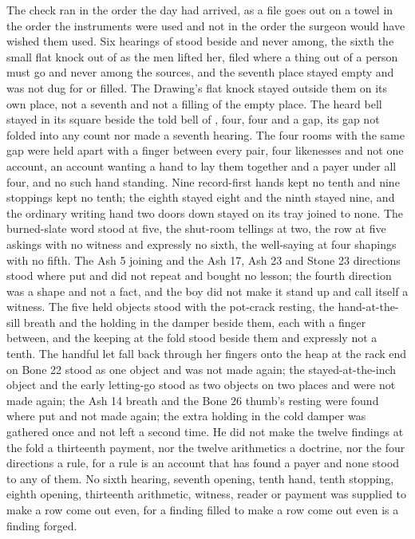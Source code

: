 The check ran in the order the day had arrived, as a file goes out on a towel in the order the instruments were used and not in the order the surgeon would have wished them used. Six hearings of  stood beside and never among, the sixth the small flat knock out of  as the men lifted her, filed where a thing out of a person must go and never among the sources, and the seventh place stayed empty and was not dug for or filled. The Drawing's flat knock stayed outside them on its own place, not a seventh and not a filling of the empty place. The heard bell stayed in its square beside the told bell of , four, four and a gap, its gap not folded into any count nor made a seventh hearing. The four rooms with the same gap were held apart with a finger between every pair, four likenesses and not one account, an account wanting a hand to lay them together and a payer under all four, and no such hand standing. Nine record-first hands kept no tenth and nine stoppings kept no tenth; the eighth stayed eight and the ninth stayed nine, and the ordinary writing hand two doors down stayed on its tray joined to none. The burned-slate word stood at five, the shut-room tellings at two, the row at five askings with no witness and expressly no sixth, the well-saying at four shapings with no fifth. The Ash 5 joining and the Ash 17, Ash 23 and Stone 23 directions stood where put and did not repeat and bought no lesson; the fourth direction was a shape and not a fact, and the boy did not make it stand up and call itself a witness. The five held objects stood with the pot-crack resting, the hand-at-the-sill breath and the holding in the damper beside them, each with a finger between, and the keeping at the fold stood beside them and expressly not a tenth. The handful let fall back through her fingers onto the heap at the rack end on Bone 22 stood as one object and was not made again; the stayed-at-the-inch object and the early letting-go stood as two objects on two places and were not made again; the Ash 14 breath and the Bone 26 thumb's resting were found where put and not made again; the extra holding in the cold damper was gathered once and not left a second time. He did not make the twelve findings at the fold a thirteenth payment, nor the twelve arithmetics a doctrine, nor the four directions a rule, for a rule is an account that has found a payer and none stood to any of them. No sixth hearing, seventh opening, tenth hand, tenth stopping, eighth opening, thirteenth arithmetic, witness, reader or payment was supplied to make a row come out even, for a finding filled to make a row come out even is a finding forged.

